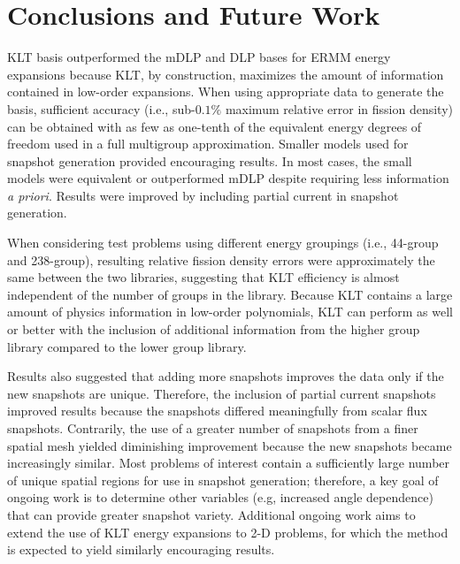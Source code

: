 \documentclass[5p,times,twocolumn,10pt]{elsarticle}
\begin{document}
  \section{Conclusions and Future Work}
  
  KLT basis outperformed the mDLP and DLP bases for ERMM energy expansions because KLT, by construction, maximizes 
  the amount of information contained in low-order expansions. When using appropriate data to generate the basis, sufficient
  accuracy (i.e., sub-$0.1\%$ maximum relative error in fission density) can be obtained with as few as one-tenth of the 
  equivalent energy degrees of freedom used in a full multigroup approximation.  Smaller models used for snapshot generation provided
  encouraging results.  In most cases, the small models were equivalent or outperformed mDLP despite requiring less information {\it a priori}.
  Results were improved by including partial current in snapshot generation.  
  
  When considering test problems using different energy groupings (i.e., 44-group and 238-group), resulting relative 
  fission density errors were approximately the same between the two libraries, suggesting that KLT efficiency is
  almost independent of the number of groups in the library.  Because KLT contains a large amount of physics information in 
  low-order polynomials, KLT can perform as well or better with the inclusion of additional information from the higher
  group library compared to the lower group library.
  
  Results also suggested that adding more snapshots improves the data only if the new snapshots are unique.  Therefore,
  the inclusion of partial current snapshots improved results because the snapshots differed meaningfully from scalar flux snapshots.
  Contrarily, the use of a greater number of snapshots from a finer spatial mesh yielded diminishing improvement because the new 
  snapshots became increasingly similar.  Most problems of interest contain a sufficiently large number of unique spatial
  regions for use in snapshot generation; therefore, a key goal of ongoing work is to determine other variables (e.g, increased angle dependence)
  that can provide greater snapshot variety.  Additional ongoing work aims to extend the use of KLT energy expansions to 2-D problems,
  for which the method is expected to yield similarly encouraging results.
  
  
  
\end{document}
